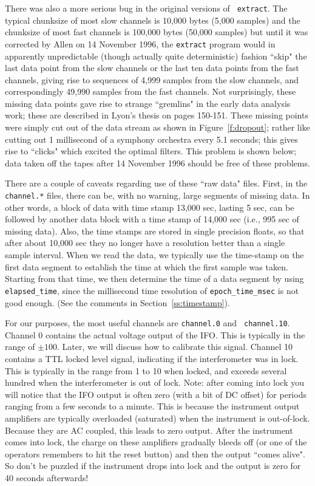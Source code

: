 There was also a more serious bug in the original versions of {\tt
extract}.  The typical chunksize of most slow channels is 10,000 bytes
(5,000 samples) and the chunksize of most fast channels is 100,000
bytes (50,000 samples) but until it was corrected by Allen on 14
November 1996, the {\tt extract} program would in apparently
unpredictable (though actually quite deterministic) fashion  ``skip"
the last data point from the slow channels or the last ten data points
from the fast channels, giving rise to sequences of 4,999 samples from
the slow channels, and correspondingly 49,990 samples from the fast
channels.  Not surprisingly, these missing data points gave rise to
strange ``gremlins" in the early data analysis work; these are
described in Lyon's thesis \cite{Lyons} on pages 150-151.  These
missing points were simply cut out of the data stream as shown in
Figure~\ref{f:dropout}; rather like cutting out 1 millisecond of a
symphony orchestra every 5.1 seconds; this gives rise to ``clicks"
which excited the optimal filters.  This problem is shown below; data
taken off the tapes after 14 November 1996 should be free of these
problems.

There are a couple of caveats regarding use of these ``raw data" files.
First, in the {\tt channel.*} files, there can be, with no warning,
large segments of missing data.  In other words, a block of data with
time stamp 13,000 sec, lasting 5 sec, can be followed by another data
block with a time stamp of 14,000 sec (i.e., 995 sec of missing data).
Also, the time stamps are stored in single precision floats, so that
after about 10,000 sec they no longer have a resolution better than a
single sample interval.  When we read the data, we typically use the
time-stamp on the first data segment to establish the time at which the
first sample was taken. Starting from that time, we then determine the
time of a data segment by using {\tt elapsed\_time}, since the millisecond
time resolution of {\tt epoch\_time\_msec} is not good enough.  (See the
comments in Section~\ref{ss:timestamp}).

For our purposes, the most useful channels are {\tt channel.0} and {\tt
channel.10}.  Channel 0 contains the actual voltage output of the IFO.
This is typically in the range of $\pm 100$.  Later, we will discuss
how to calibrate this signal.  Channel 10 contains a TTL locked level
signal, indicating if the interferometer was in lock.  This is typically
in the range from 1 to 10 when locked, and exceeds several hundred when
the interferometer is out of lock.  Note: after coming into lock you
will notice that the IFO output is often zero (with a bit of DC offset)
for periods ranging from a few seconds to a minute.  This is because
the instrument output amplifiers are typically overloaded (saturated)
when the instrument is out-of-lock.  Because they are AC coupled,
this leads to zero output.  After the instrument comes into lock, the
charge on these amplifiers gradually bleeds off (or one of the operators
remembers to hit the reset button) and then the output ``comes alive".
So don't be puzzled if the instrument drops into lock and the output is
zero for 40 seconds afterwards!


